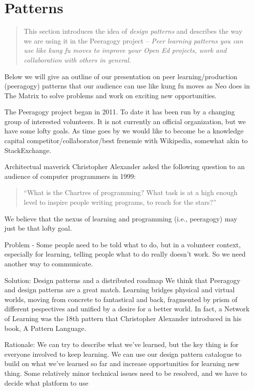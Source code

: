 \section{Patterns}
\begin{quote}
This section introduces the idea of \emph{design patterns} and describes the way we are using it in the Peeragogy project -- \emph{Peer learning patterns you can use like kung fu moves to improve your Open Ed projects, work and collaboration with others in general.}
\end{quote}

Below we will give an outline of our presentation on peer learning/production (peeragogy) patterns that our audience can use like kung fu moves as Neo does in The Matrix to solve problems and work on exciting new opportunities.

The Peeragogy project began in 2011.  To date it has been run by a changing group of interested volunteers.   It is not currently an official organization, but we have some lofty goals.  As time goes by we would like to become be a knowledge capital competitor/collaborator/best frenemie with Wikipedia, somewhat akin to StackExchange.

Architectual maverick Christopher Alexander asked the following question to an audience of computer programmers in 1999: 
\begin{quote}
``What is the Chartres of programming? What task is at a high enough level to inspire people writing programs, to reach for the stars?''
\end{quote}
We believe that the nexus of learning and programming (i.e., peeragogy) may just be that lofty goal.

Problem - Some people need to be told what to do, but in a volunteer context, especially for learning, telling people what to do really doesn't work.  So we need another way to communicate.

Solution: Design patterns and a distributed roadmap
We think that Peeragogy and design patterns are a great match.  Learning bridges physical and virtual worlds, moving from concrete to fantastical and back, fragmented by prism of different pespectives and unified by a desire for a better world. In fact, a Network of Learning was the 18th pattern that Christopher Alexander introduced in his book, A Pattern Language.

Rationale:
We can try to describe what we've learned, but the key thing is for everyone involved to keep learning. We can use our design pattern catalogue to build on what we've learned so far and increase opportunities for learning new thing.
Some relatively minor technical issues need to be resolved, and we
have to decide what platform to use

